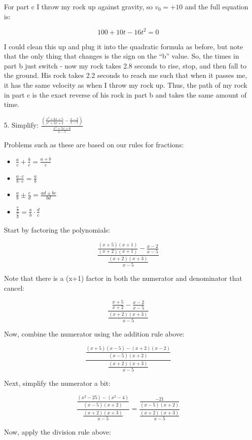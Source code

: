 \documentclass[letterpaper, 12pt]{article}
\begin{document}
\bigskip

For part c I throw my rock up against gravity, so $v_0=+10$ and the full
equation is:

\[100+10t-16t^2=0\]

I could clean this up and plug it into the quadratic formula as before, but
note that the only thing that changes is the sign on the ``b'' value. So, the
times in part b just switch - now my rock takes 2.8 seconds to rise, stop, and
then fall to the ground.  His rock takes 2.2 seconds to reach me such that when
it passes me, it has the same velocity as when I throw my rock up.  Thus, the
path of my rock in part c is the exact reverse of his rock in part b and takes
the same amount of time.

\bigskip

5. Simplify: $\frac{\left(\frac{x^2+6x+5}{x^2+3x+2}-\frac{x-2}{x-5}\right)}
    {\frac{x^2+5x+6}{x-5}}$

\bigskip

Problems such as these are based on our rules for fractions:

\begin{itemize}
\item{$\frac{a}{c}+\frac{b}{c}=\frac{a+b}{c}$}
\item{$\frac{a\cdot c}{b\cdot c}=\frac{a}{b}$}
\item{$\frac{a}{b}\pm\frac{c}{d}=\frac{ad\pm bc}{bd}$}
\item{$\frac{\frac{a}{b}}{\frac{c}{d}}=\frac{a}{b}\cdot\frac{d}{c}$}
\end{itemize}

Start by factoring the polynomials:

\[\frac{\frac{(x+5)(x+1)}{(x+2)(x+1)}-\frac{x-2}{x-5}}
{\frac{(x+2)(x+3)}{x-5}}\]

Note that there is a (x+1) factor in both the numerator and denominator that
cancel:

\[\frac{\frac{x+5}{x+2}-\frac{x-2}{x-5}}{\frac{(x+2)(x+3)}{x-5}}\]

Now, combine the numerator using the addition rule above:

\[\frac{\frac{(x+5)(x-5)-(x+2)(x-2)}{(x-5)(x+2)}}{\frac{(x+2)(x+3)}{x-5}}\]

Next, simplify the numerator a bit:

\[\frac{\frac{(x^2-25)-(x^2-4)}{(x-5)(x+2)}}{\frac{(x+2)(x+3)}{x-5}}=
\frac{\frac{-21}{(x-5)(x+2)}}{\frac{(x+2)(x+3)}{x-5}}\]

Now, apply the division rule above:
\end{document}
